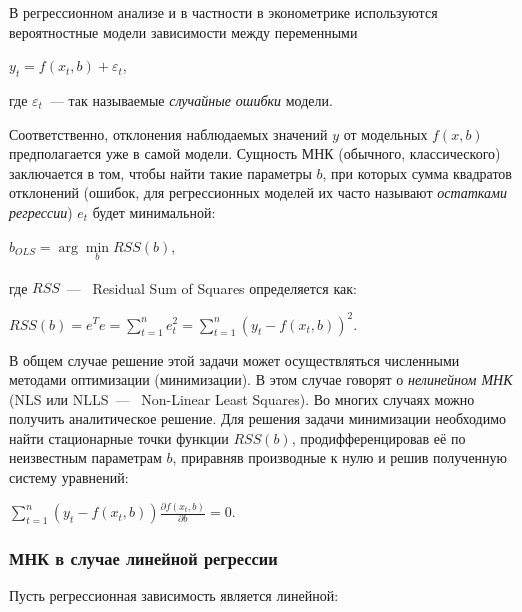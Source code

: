 \documentclass[a4paper]{article}
\begin{document}
{{{{{{{{В регрессионном анализе и в частности в эконометрике используются
вероятностные модели зависимости между переменными

\begin{center}
 {{\(y_{t} = f(x_{t},b) + \varepsilon_{t}\)}},
\end{center}

где {{\(\varepsilon_{t}\)}}~--- так называемые \emph{случайные ошибки}
модели.

Соответственно, отклонения наблюдаемых значений {{\(y\)}} от модельных
{{\(f(x,b)\)}} предполагается уже в самой модели. Сущность МНК
(обычного, классического) заключается в том, чтобы найти такие параметры
{{\(b\)}}, при которых сумма квадратов отклонений (ошибок, для
регрессионных моделей их часто называют \emph{остатками регрессии})
{{\(e_{t}\)}} будет минимальной:

\begin{center}
 {{\({\hat{b}}_{OLS} = \arg\min\limits_{b}RSS(b)\)}},
\end{center}

где {{\(RSS\)}}~--- ~\foreignlanguage{english}{Residual Sum of
Squares}\textsuperscript{} определяется как:

\begin{center}
 {{\(RSS(b) = e^{T}e = \sum\limits_{t = 1}^{n}e_{t}^{2} = \sum\limits_{t = 1}^{n}(y_{t} - f(x_{t},b))^{2}\)}}.
\end{center}

В общем случае решение этой задачи может осуществляться численными
методами оптимизации (минимизации). В этом случае говорят о
\emph{нелинейном МНК} (NLS или NLLS~---
~\foreignlanguage{english}{Non-Linear Least Squares}). Во многих случаях
можно получить аналитическое решение. Для решения задачи минимизации
необходимо найти стационарные точки функции {{\(RSS(b)\)}},
продифференцировав её по неизвестным параметрам {{\(b\)}}, приравняв
производные к нулю и решив полученную систему уравнений:

\begin{center}
 {{\(\sum\limits_{t = 1}^{n}(y_{t} - f(x_{t},b))\frac{\partial f(x_{t},b)}{\partial b} = 0\)}}.
\end{center}

\subsubsection{МНК в случае линейной регрессии}

Пусть регрессионная зависимость является линейной:

}}}}}}}}
\end{document}
